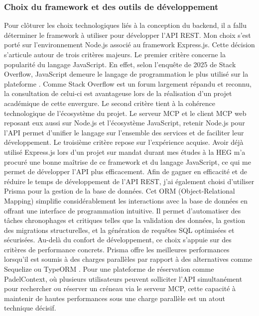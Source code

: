 \documentclass[12pt]{article}
\begin{document}
\subsubsection{Choix du framework et des outils de développement}
Pour clôturer les choix technologiques liés à la conception du backend, il a fallu déterminer le framework à utiliser pour développer l'API REST. Mon choix s'est porté sur l'environnement Node.js associé au framework Express.js. Cette décision s'articule autour de trois critères majeurs.
\newline\newline
Le premier critère concerne la popularité du langage JavaScript. En effet, selon l'enquête de 2025 de Stack Overflow, JavaScript demeure le langage de programmation le plus utilisé sur la plateforme \parencite{stack_overflow_stack_2025}. Comme Stack Overflow est un forum largement répandu et reconnu, la consultation de celui-ci est avantageuse lors de la réalisation d'un projet académique de cette envergure.
\newline\newline
Le second critère tient à la cohérence technologique de l'écosystème du projet. Le serveur MCP et le client MCP web reposant eux aussi sur Node.js et l'écosystème JavaScript, retenir Node.js pour l'API permet d'unifier le langage sur l'ensemble des services et de faciliter leur développement.
\newline\newline
Le troisième critère repose sur l'expérience acquise. Avoir déjà utilisé Express.js lors d'un projet sur mandat durant mes études à la HEG m'a procuré une bonne maîtrise de ce framework et du langage JavaScript, ce qui me permet de développer l'API plus efficacement.
\newline\newline
Afin de gagner en efficacité et de réduire le temps de développement de l'API REST, j'ai également choisi d'utiliser Prisma pour la gestion de la base de données. Cet ORM (Object-Relational Mapping) simplifie considérablement les interactions avec la base de données en offrant une interface de programmation intuitive. Il permet d'automatiser des tâches chronophages et critiques telles que la validation des données, la gestion des migrations structurelles, et la génération de requêtes SQL optimisées et sécurisées.
\newline\newline
Au-delà du confort de développement, ce choix s'appuie sur des critères de performance concrets. Prisma offre les meilleures performances lorsqu'il est soumis à des charges parallèles par rapport à des alternatives comme Sequelize ou TypeORM \parencite{zhadko-bazilevych_analysis_2025}. Pour une plateforme de réservation comme PadelContext, où plusieurs utilisateurs peuvent solliciter l'API simultanément pour rechercher ou réserver un créneau via le serveur MCP, cette capacité à maintenir de hautes performances sous une charge parallèle est un atout technique décisif.
\end{document}
